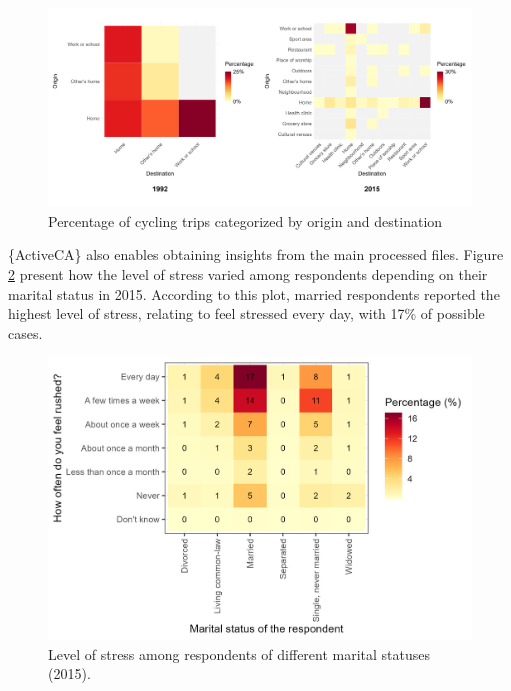 \documentclass[Royal,times,sageh]{sagej}
\begin{document}
\begin{figure}

{\centering \includegraphics[width=1\linewidth]{Manuscript-figures/cycling_hm_fig} 

}

\caption{Percentage of cycling trips categorized by origin and destination}\label{fig:figure-02}
\end{figure}

\{ActiveCA\} also enables obtaining insights from the main processed
files. Figure \ref{fig:figure-stress} present how the level of stress
varied among respondents depending on their marital status in 2015.
According to this plot, married respondents reported the highest level
of stress, relating to feel stressed every day, with 17\% of possible
cases.

\begin{figure}

{\centering \includegraphics[width=1\linewidth]{Manuscript-figures/main_stress_figure} 

}

\caption{Level of stress among respondents of different marital statuses (2015).}\label{fig:figure-stress}
\end{figure}
\end{document}
